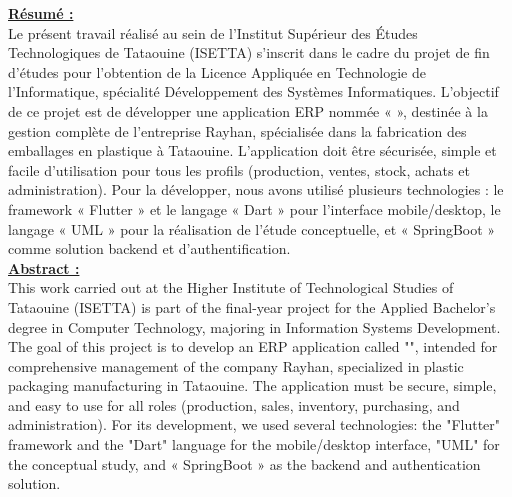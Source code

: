 \fontsize{12pt}{12pt}\selectfont%
\underline{\textbf{Résumé :}}\\
Le présent travail réalisé au sein de l’Institut Supérieur des Études Technologiques de Tataouine (ISETTA) s’inscrit dans le cadre du projet de fin d’études pour l’obtention de la Licence Appliquée en Technologie de l’Informatique, spécialité Développement des Systèmes Informatiques. L’objectif de ce projet est de développer une application ERP nommée « \reportAppName{} », destinée à la gestion complète de l’entreprise Rayhan, spécialisée dans la fabrication des emballages en plastique à Tataouine. L’application doit être sécurisée, simple et facile d’utilisation pour tous les profils (production, ventes, stock, achats et administration). Pour la développer, nous avons utilisé plusieurs technologies : le framework « Flutter » et le langage « Dart » pour l’interface mobile/desktop, le langage « UML » pour la réalisation de l’étude conceptuelle, et « SpringBoot » comme solution backend et d’authentification.
\vspace{10pt}
\\
\underline{\textbf{Abstract :}}\\
This work carried out at the Higher Institute of Technological Studies of Tataouine (ISETTA) is part of the final-year project for the Applied Bachelor's degree in Computer Technology, majoring in Information Systems Development. The goal of this project is to develop an ERP application called "\reportAppName{}", intended for comprehensive management of the company Rayhan, specialized in plastic packaging manufacturing in Tataouine. The application must be secure, simple, and easy to use for all roles (production, sales, inventory, purchasing, and administration). For its development, we used several technologies: the "Flutter" framework and the "Dart" language for the mobile/desktop interface, "UML" for the conceptual study, and « SpringBoot » as the backend and authentication solution.\par



    